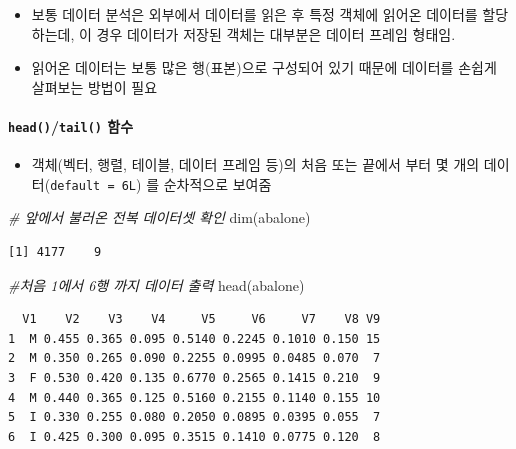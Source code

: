 \documentclass[
  11pt,
]{krantz}
\newenvironment{Shaded}{\begin{snugshade}}{\end{snugshade}}
\newcommand{\CommentTok}[1]{\textcolor[rgb]{0.37,0.37,0.37}{\textit{#1}}}
\newcommand{\FunctionTok}[1]{\textcolor[rgb]{0,0,0}{#1}}
\newcommand{\NormalTok}[1]{#1}
\providecommand{\tightlist}{%
  \setlength{\itemsep}{0pt}\setlength{\parskip}{0pt}}
\begin{document}
\begin{itemize}
\tightlist
\item
  보통 데이터 분석은 외부에서 데이터를 읽은 후 특정 객체에 읽어온 데이터를 할당하는데, 이 경우 데이터가 저장된 객체는 대부분은 데이터 프레임 형태임.
\item
  읽어온 데이터는 보통 많은 행(표본)으로 구성되어 있기 때문에 데이터를 손쉽게 살펴보는 방법이 필요
\end{itemize}

\hypertarget{head-tail}{%
\paragraph*{\texorpdfstring{\texttt{head()}/\texttt{tail()} 함수}{head()/tail() 함수}}\label{head-tail}}

\begin{itemize}
\tightlist
\item
  객체(벡터, 행렬, 테이블, 데이터 프레임 등)의 처음 또는 끝에서 부터 몇 개의 데이터(\texttt{default\ =\ 6L}) 를 순차적으로 보여줌
\end{itemize}

\footnotesize

\begin{Shaded}
\begin{Highlighting}[]
\CommentTok{\# 앞에서 불러온 전복 데이터셋 확인}
\FunctionTok{dim}\NormalTok{(abalone)}
\end{Highlighting}
\end{Shaded}

\begin{verbatim}
[1] 4177    9
\end{verbatim}

\begin{Shaded}
\begin{Highlighting}[]
\CommentTok{\#처음 1에서 6행 까지 데이터 출력}
\FunctionTok{head}\NormalTok{(abalone)}
\end{Highlighting}
\end{Shaded}

\begin{verbatim}
  V1    V2    V3    V4     V5     V6     V7    V8 V9
1  M 0.455 0.365 0.095 0.5140 0.2245 0.1010 0.150 15
2  M 0.350 0.265 0.090 0.2255 0.0995 0.0485 0.070  7
3  F 0.530 0.420 0.135 0.6770 0.2565 0.1415 0.210  9
4  M 0.440 0.365 0.125 0.5160 0.2155 0.1140 0.155 10
5  I 0.330 0.255 0.080 0.2050 0.0895 0.0395 0.055  7
6  I 0.425 0.300 0.095 0.3515 0.1410 0.0775 0.120  8
\end{verbatim}
\end{document}
